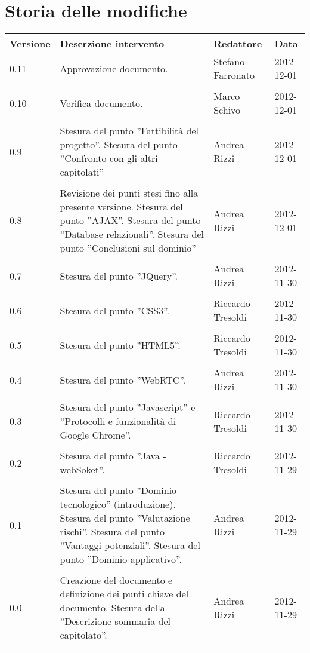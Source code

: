 \section*{Storia delle modifiche}
\begin{tabularx}{\textwidth}{lXll}
\toprule
Versione & Descrzione intervento & Redattore & Data\\
\midrule %
0.11 & Approvazione documento. & Stefano Farronato & 2012-12-01\\\\
0.10 & Verifica documento. & Marco Schivo & 2012-12-01\\\\
0.9 & Stesura del punto ''Fattibilità del progetto''. Stesura del punto ''Confronto con gli altri capitolati'' & Andrea Rizzi & 2012-12-01\\\\
0.8 & Revisione dei punti stesi fino alla presente versione. Stesura del punto ''AJAX''. Stesura del punto ''Database relazionali''. Stesura del punto ''Conclusioni sul dominio'' & Andrea Rizzi & 2012-12-01\\\\
0.7 & Stesura del punto ''JQuery''. & Andrea Rizzi & 2012-11-30\\\\
0.6 & Stesura del punto ''CSS3''. & Riccardo Tresoldi & 2012-11-30\\\\
0.5 & Stesura del punto ''HTML5''. & Riccardo Tresoldi& 2012-11-30\\\\
0.4 & Stesura del punto ''WebRTC''. & Andrea Rizzi & 2012-11-30\\\\
0.3 & Stesura del punto ''Javascript'' e ''Protocolli e funzionalità di Google Chrome''.  & Riccardo Tresoldi & 2012-11-30\\\\
0.2 & Stesura del punto ''Java - webSoket''.  & Riccardo Tresoldi & 2012-11-29\\\\
0.1 & Stesura del punto ''Dominio tecnologico'' (introduzione). Stesura del punto ''Valutazione rischi''. Stesura del punto ''Vantaggi potenziali''. Stesura del punto ''Dominio applicativo''.  & Andrea Rizzi & 2012-11-29\\\\
0.0 & Creazione del documento e definizione dei punti chiave del documento. Stesura della ''Descrizione sommaria del capitolato''. & Andrea Rizzi & 2012-11-29\\\\
\bottomrule
\end{tabularx}
\newpage

